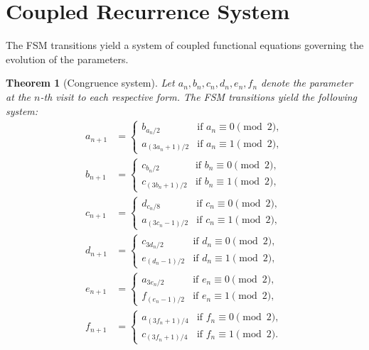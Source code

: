 \documentclass[11pt,a4paper]{article}
\theoremstyle{plain}
\newtheorem{theorem}{Theorem}[section]
\theoremstyle{definition}
\begin{document}
\section{Coupled Recurrence System}
\label{sec:congruence}

The FSM transitions yield a system of coupled functional equations governing the evolution of the parameters.

\begin{theorem}[Congruence system]\label{thm:congruence_system}
  Let $a_n, b_n, c_n, d_n, e_n, f_n$ denote the parameter at the $n$-th visit to each respective form. The FSM transitions yield the following system:
  \begin{align}
    a_{n+1} &= \begin{cases} b_{a_n/2} & \text{if } a_n \equiv 0 \pmod{2}, \\ a_{(3a_n+1)/2} & \text{if } a_n \equiv 1 \pmod{2}, \end{cases} \label{eq:sys_a} \\[4pt]
    b_{n+1} &= \begin{cases} c_{b_n/2} & \text{if } b_n \equiv 0 \pmod{2}, \\ c_{(3b_n+1)/2} & \text{if } b_n \equiv 1 \pmod{2}, \end{cases} \label{eq:sys_b} \\[4pt]
    c_{n+1} &= \begin{cases} d_{c_n/8} & \text{if } c_n \equiv 0 \pmod{2}, \\ a_{(3c_n-1)/2} & \text{if } c_n \equiv 1 \pmod{2}, \end{cases} \label{eq:sys_c} \\[4pt]
    d_{n+1} &= \begin{cases} c_{3d_n/2} & \text{if } d_n \equiv 0 \pmod{2}, \\ e_{(d_n-1)/2} & \text{if } d_n \equiv 1 \pmod{2}, \end{cases} \label{eq:sys_d} \\[4pt]
    e_{n+1} &= \begin{cases} a_{3e_n/2} & \text{if } e_n \equiv 0 \pmod{2}, \\ f_{(e_n-1)/2} & \text{if } e_n \equiv 1 \pmod{2}, \end{cases} \label{eq:sys_e} \\[4pt]
    f_{n+1} &= \begin{cases} a_{(3f_n+1)/4} & \text{if } f_n \equiv 0 \pmod{2}, \\ c_{(3f_n+1)/4} & \text{if } f_n \equiv 1 \pmod{2}. \end{cases} \label{eq:sys_f}
  \end{align}
\end{theorem}
\end{document}
